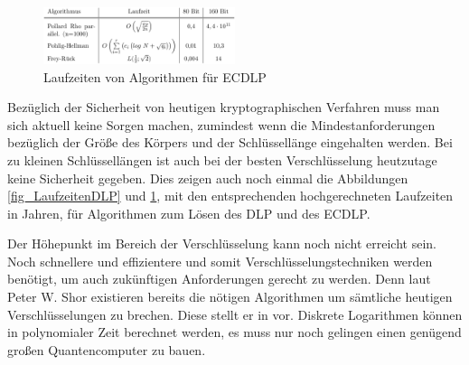 	\begin{figure}
		\centering
		\includegraphics[width=0.5\textwidth]{includes/images/LaufzeitenECDLP.PNG}
		\caption{Laufzeiten von Algorithmen für ECDLP~\cite{DLP:ECDLP:Probleme:und:Loesungen}}
		\label{fig_LaufzeitenECDLP}
	\end{figure}

	Bezüglich der Sicherheit von heutigen kryptographischen Verfahren muss man sich aktuell keine Sorgen machen, zumindest wenn die Mindestanforderungen bezüglich der Größe des Körpers und der Schlüssellänge eingehalten werden. Bei zu kleinen Schlüssellängen ist auch bei der besten Verschlüsselung heutzutage keine Sicherheit gegeben. Dies zeigen auch noch einmal die Abbildungen \ref{fig_LaufzeitenDLP} und \ref{fig_LaufzeitenECDLP}, mit den entsprechenden hochgerechneten Laufzeiten in Jahren, für Algorithmen zum Lösen des DLP und des ECDLP.
	
	Der Höhepunkt im Bereich der Verschlüsselung kann noch nicht erreicht sein. Noch schnellere und effizientere und somit  Verschlüsselungstechniken werden benötigt, um auch zukünftigen Anforderungen gerecht zu werden. Denn laut Peter W. Shor existieren bereits die nötigen Algorithmen um sämtliche heutigen Verschlüsselungen zu brechen. Diese stellt er in \cite{Algorithms:for:Quantum:Computation:Discrete:Logarithms:and:Factoring} vor. Diskrete Logarithmen können in polynomialer Zeit berechnet werden, es muss nur noch gelingen einen genügend großen Quantencomputer zu bauen.